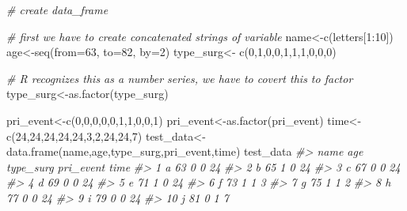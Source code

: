\documentclass[
]{book}
\newenvironment{Shaded}{\begin{snugshade}}{\end{snugshade}}
\newcommand{\AttributeTok}[1]{\textcolor[rgb]{0.77,0.63,0.00}{#1}}
\newcommand{\CommentTok}[1]{\textcolor[rgb]{0.56,0.35,0.01}{\textit{#1}}}
\newcommand{\DecValTok}[1]{\textcolor[rgb]{0.00,0.00,0.81}{#1}}
\newcommand{\FunctionTok}[1]{\textcolor[rgb]{0.00,0.00,0.00}{#1}}
\newcommand{\NormalTok}[1]{#1}
\newcommand{\OtherTok}[1]{\textcolor[rgb]{0.56,0.35,0.01}{#1}}
\newcommand{\SpecialCharTok}[1]{\textcolor[rgb]{0.00,0.00,0.00}{#1}}
\begin{document}
\begin{Shaded}
\begin{Highlighting}[]
\CommentTok{\# create data\_frame}

\CommentTok{\# first we have to create concatenated strings of variable}
\NormalTok{name}\OtherTok{\textless{}{-}}\FunctionTok{c}\NormalTok{(letters[}\DecValTok{1}\SpecialCharTok{:}\DecValTok{10}\NormalTok{])}
\NormalTok{age}\OtherTok{\textless{}{-}}\FunctionTok{seq}\NormalTok{(}\AttributeTok{from=}\DecValTok{63}\NormalTok{, }\AttributeTok{to=}\DecValTok{82}\NormalTok{, }\AttributeTok{by=}\DecValTok{2}\NormalTok{)}
\NormalTok{type\_surg}\OtherTok{\textless{}{-}} \FunctionTok{c}\NormalTok{(}\DecValTok{0}\NormalTok{,}\DecValTok{1}\NormalTok{,}\DecValTok{0}\NormalTok{,}\DecValTok{0}\NormalTok{,}\DecValTok{1}\NormalTok{,}\DecValTok{1}\NormalTok{,}\DecValTok{1}\NormalTok{,}\DecValTok{0}\NormalTok{,}\DecValTok{0}\NormalTok{,}\DecValTok{0}\NormalTok{)}

\CommentTok{\# R recognizes this as a number series, we have to covert this to factor}
\NormalTok{type\_surg}\OtherTok{\textless{}{-}}\FunctionTok{as.factor}\NormalTok{(type\_surg)}

\NormalTok{pri\_event}\OtherTok{\textless{}{-}}\FunctionTok{c}\NormalTok{(}\DecValTok{0}\NormalTok{,}\DecValTok{0}\NormalTok{,}\DecValTok{0}\NormalTok{,}\DecValTok{0}\NormalTok{,}\DecValTok{0}\NormalTok{,}\DecValTok{1}\NormalTok{,}\DecValTok{1}\NormalTok{,}\DecValTok{0}\NormalTok{,}\DecValTok{0}\NormalTok{,}\DecValTok{1}\NormalTok{)}
\NormalTok{pri\_event}\OtherTok{\textless{}{-}}\FunctionTok{as.factor}\NormalTok{(pri\_event)}
\NormalTok{time}\OtherTok{\textless{}{-}}\FunctionTok{c}\NormalTok{(}\DecValTok{24}\NormalTok{,}\DecValTok{24}\NormalTok{,}\DecValTok{24}\NormalTok{,}\DecValTok{24}\NormalTok{,}\DecValTok{24}\NormalTok{,}\DecValTok{3}\NormalTok{,}\DecValTok{2}\NormalTok{,}\DecValTok{24}\NormalTok{,}\DecValTok{24}\NormalTok{,}\DecValTok{7}\NormalTok{)}
\NormalTok{test\_data}\OtherTok{\textless{}{-}} \FunctionTok{data.frame}\NormalTok{(name,age,type\_surg,pri\_event,time)}
\NormalTok{test\_data}
\CommentTok{\#\textgreater{}    name age type\_surg pri\_event time}
\CommentTok{\#\textgreater{} 1     a  63         0         0   24}
\CommentTok{\#\textgreater{} 2     b  65         1         0   24}
\CommentTok{\#\textgreater{} 3     c  67         0         0   24}
\CommentTok{\#\textgreater{} 4     d  69         0         0   24}
\CommentTok{\#\textgreater{} 5     e  71         1         0   24}
\CommentTok{\#\textgreater{} 6     f  73         1         1    3}
\CommentTok{\#\textgreater{} 7     g  75         1         1    2}
\CommentTok{\#\textgreater{} 8     h  77         0         0   24}
\CommentTok{\#\textgreater{} 9     i  79         0         0   24}
\CommentTok{\#\textgreater{} 10    j  81         0         1    7}


\end{Highlighting}
\end{Shaded}
\end{document}
